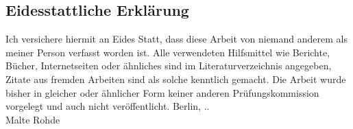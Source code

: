 \subsection*{Eidesstattliche Erklärung}

Ich versichere hiermit an Eides Statt, dass diese Arbeit von niemand anderem als
meiner Person verfasst worden ist. Alle verwendeten Hilfsmittel wie Berichte,
Bücher, Internetseiten oder ähnliches sind im Literaturverzeichnis angegeben,
Zitate aus fremden Arbeiten sind als solche kenntlich gemacht. Die Arbeit wurde
bisher in gleicher oder ähnlicher Form keiner anderen Prüfungskommission
vorgelegt und auch nicht veröffentlicht. \parbig
Berlin, \the\day{}.\the\month{}.\the\year\\[16ex]
Malte Rohde

\clearpage